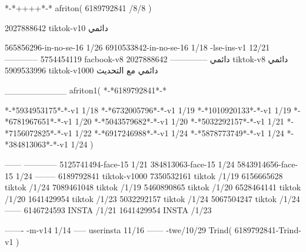 *-*++++*-*
afriton(
6189792841 /8/8
)

2027888642 tiktok-v10
دائمي

565856296-in-no-se-16 1/26
6910533842-in-no-se-16 1/18
-lse-ins-v1 12/21
------------
5754454119 facbook-v8
دائمي
--------------
2027888642 tiktok-v8
دائمي
5909533996 tiktok-v1000
دائمي مع التحديث

__________
afriton1(
*-*6189792841*-*


*-*5934953175*-*-v1 1/18
*-*6732005796*-*-v1 1/19
*-*1010920133*-*-v1 1/19
*-*6781967651*-*-v1 1/20
*-*5043579682*-*-v1 1/20
*-*5032292157*-*-v1 1/21
*-*7156072825*-*-v1 1/22
*-*6917246988*-*-v1 1/24
*-*5878773749*-*-v1 1/24
*-*384813063*-*-v1 1/24
)

------
------------
5125741494-face-15 1/21
384813063-face-15 1/24
5843914656-face-15 1/24
--------
6189792841 tiktok-v1000
7350532161 tiktok /1/19
6156665628 tiktok /1/24
7089461048 tiktok /1/19
5460890865 tiktok /1/20
6528464141 tiktok /1/20
1641429954 tiktok /1/23
5032292157 tiktok /1/24
5067504247 tiktok /1/24
------
6146724593 INSTA /1/21
1641429954 INSTA /1/23

-------
-m-v14 1/14
-----
userinsta 11/16
------
-twe/10/29
Trind(
6189792841-Trind-v1 
)
